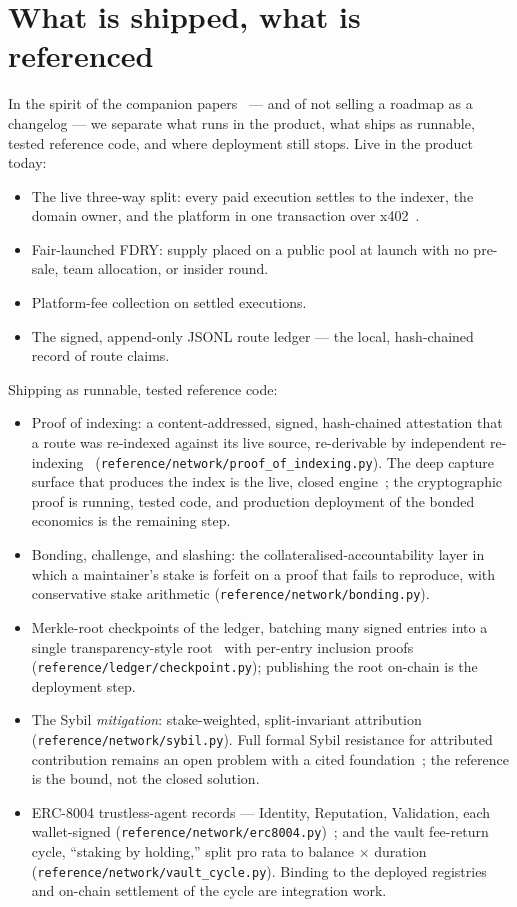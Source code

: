 \documentclass[11pt]{article}
\begin{document}
\section{What is shipped, what is referenced}

In the spirit of the companion papers~\cite{wedge,security} --- and of not selling a
roadmap as a changelog --- we separate what runs in the product, what ships as
runnable, tested reference code, and where deployment still stops. Live in the
product today:
\begin{itemize}[leftmargin=1.4em]
\item The live three-way split: every paid execution settles to the
indexer, the domain owner, and the platform in one transaction over
x402~\cite{x402}.
\item Fair-launched FDRY: supply placed on a public pool at launch with no
pre-sale, team allocation, or insider round.
\item Platform-fee collection on settled executions.
\item The signed, append-only JSONL route ledger --- the local, hash-chained
record of route claims.
\end{itemize}
Shipping as runnable, tested reference code:
\begin{itemize}[leftmargin=1.4em]
\item Proof of indexing: a content-addressed, signed, hash-chained
attestation that a route was re-indexed against its live source, re-derivable by
independent re-indexing~\cite{thegraph,filecoin2017}
(\texttt{reference/network/\allowbreak proof\_of\_indexing.py}). The deep capture
surface that produces the index is the live, closed engine~\cite{ossnotice}; the
cryptographic proof is running, tested code, and production deployment of the bonded
economics is the remaining step.
\item Bonding, challenge, and slashing: the collateralised-accountability
layer in which a maintainer's stake is forfeit on a proof that fails to reproduce,
with conservative stake arithmetic (\texttt{reference/network/bonding.py}).
\item Merkle-root checkpoints of the ledger, batching many signed entries
into a single transparency-style root~\cite{rfc6962} with per-entry inclusion proofs
(\texttt{reference/ledger/checkpoint.py}); publishing the root on-chain is the
deployment step.
\item The Sybil \emph{mitigation}: stake-weighted, split-invariant
attribution (\texttt{reference/network/sybil.py}). Full formal Sybil resistance for
attributed contribution remains an open problem with a cited
foundation~\cite{sybil}; the reference is the bound, not the closed solution.
\item ERC-8004 trustless-agent records --- Identity, Reputation,
Validation, each wallet-signed (\texttt{reference/network/erc8004.py})~\cite{erc8004};
and the vault fee-return cycle, ``staking by holding,'' split pro rata to
balance $\times$ duration (\texttt{reference/network/vault\_cycle.py}). Binding to
the deployed registries and on-chain settlement of the cycle are integration work.
\end{itemize}
\end{document}
